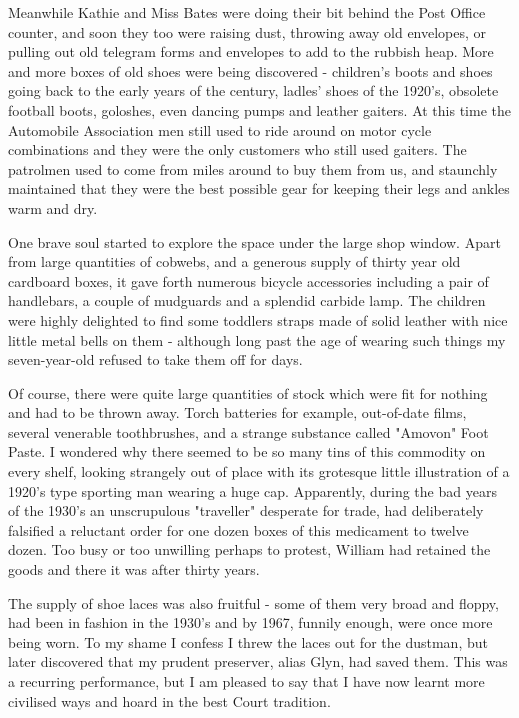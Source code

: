 Meanwhile Kathie and Miss Bates were doing their bit behind the Post Office counter, and soon they too were raising dust, throwing away old envelopes, or pulling out old telegram forms and envelopes to add to the rubbish heap. More and more boxes of old shoes were being discovered - children's boots and shoes going back to the early years of the century, ladles’ shoes of the 1920's, obsolete football boots, goloshes, even dancing pumps and leather gaiters. At this time the Automobile Association men still used to ride around on motor cycle combinations and they were the only customers who still used gaiters. The patrolmen used to come from miles around to buy them from us, and staunchly maintained that they were the best possible gear for keeping their legs and ankles warm and dry.

One brave soul started to explore the space under the large shop window. Apart from large quantities of cobwebs, and a generous supply of thirty year old cardboard boxes, it gave forth numerous bicycle accessories including a pair of handlebars, a couple of mudguards and a splendid carbide lamp. The children were highly delighted to find some toddlers straps made of solid leather with nice little metal bells on them - although long past the age of wearing such things my seven-year-old refused to take them off for days.

Of course, there were quite large quantities of stock which were fit for nothing and had to be thrown away. Torch batteries for example, out-of-date films, several venerable toothbrushes, and a strange substance called "Amovon" Foot Paste. I wondered why there seemed to be so many tins of this commodity on every shelf, looking strangely out of place with its grotesque little illustration of a 1920's type sporting man wearing a huge cap. Apparently, during the bad years of the 1930's an unscrupulous "traveller" desperate for trade, had deliberately falsified a reluctant order for one dozen boxes of this medicament to twelve dozen. Too busy or too unwilling perhaps to protest, William had retained the goods and there it was after thirty years.

The supply of shoe laces was also fruitful - some of them very broad and floppy, had been in fashion in the 1930's and by 1967, funnily enough, were once more being worn. To my shame I confess I threw the laces out for the dustman, but later discovered that my prudent preserver, alias Glyn, had saved them. This was a recurring performance, but I am pleased to say that I have now learnt more civilised ways and hoard in the best Court tradition.

